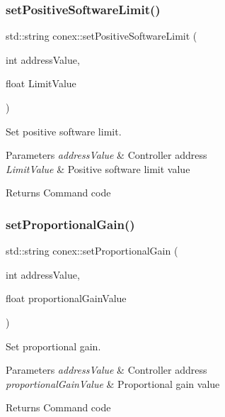 \subsubsection{\texorpdfstring{set\+Positive\+Software\+Limit()}{setPositiveSoftwareLimit()}}
{\footnotesize\ttfamily std\+::string conex\+::set\+Positive\+Software\+Limit (\begin{DoxyParamCaption}\item[{int}]{address\+Value,  }\item[{float}]{Limit\+Value }\end{DoxyParamCaption})}



Set positive software limit. 


\begin{DoxyParams}{Parameters}
{\em address\+Value} & Controller address \\
\hline
{\em Limit\+Value} & Positive software limit value \\
\hline
\end{DoxyParams}
\begin{DoxyReturn}{Returns}
Command code 
\end{DoxyReturn}
\mbox{\label{namespaceconex_a852e0fb570af45c7d523f94a2b81b84b}} 
\subsubsection{\texorpdfstring{set\+Proportional\+Gain()}{setProportionalGain()}}
{\footnotesize\ttfamily std\+::string conex\+::set\+Proportional\+Gain (\begin{DoxyParamCaption}\item[{int}]{address\+Value,  }\item[{float}]{proportional\+Gain\+Value }\end{DoxyParamCaption})}



Set proportional gain. 


\begin{DoxyParams}{Parameters}
{\em address\+Value} & Controller address \\
\hline
{\em proportional\+Gain\+Value} & Proportional gain value \\
\hline
\end{DoxyParams}
\begin{DoxyReturn}{Returns}
Command code 
\end{DoxyReturn}
\mbox{\label{namespaceconex_a4db096ebf48bf2512a51c6f16f6d05a5}} 
